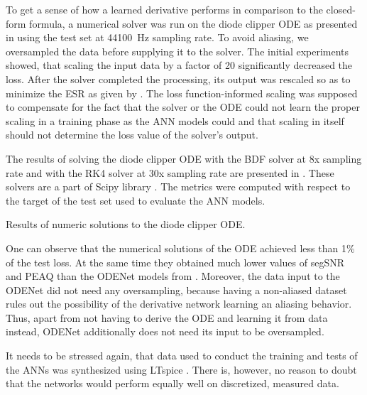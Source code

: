 To get a sense of how a learned derivative performs in comparison to the closed-form formula, a numerical solver was run on the diode clipper \ac{ODE} as presented in  using the test set at \SI{44100}{Hz} sampling rate. To avoid aliasing, we oversampled the data before supplying it to the solver. The initial experiments showed, that scaling the input data by a factor of 20 significantly decreased the loss. After the solver completed the processing, its output was rescaled so as to minimize the \ac{ESR} as given by . The loss function-informed scaling was supposed to compensate for the fact that the solver or the \ac{ODE} could not learn the proper scaling in a training phase as the \ac{ANN} models could and that scaling in itself should not determine the loss value of the solver's output. 

The results of solving the diode clipper \ac{ODE} with the \ac{BDF} solver at 8x sampling rate and with the \ac{RK}4 solver at 30x sampling rate are presented in . These solvers are a part of Scipy library \cite{SciPy}. The metrics were computed with respect to the target of the test set used to evaluate the \ac{ANN} models.

\begin{table}[]
    \centering
    \caption{Results of numeric solutions to the diode clipper \ac{ODE}.}
    
    \label{tab:diode_clipper_ode_solvers}
\end{table}

One can observe that the numerical solutions of the \ac{ODE} achieved less than 1\% of the test loss. At the same time they obtained much lower values of \ac{segSNR} and \ac{PEAQ} than the ODENet models from . Moreover, the data input to the ODENet did not need any oversampling, because having a non-aliased dataset rules out the possibility of the derivative network learning an aliasing behavior. Thus, apart from not having to derive the \ac{ODE} and learning it from data instead, ODENet additionally does not need its input to be oversampled.

It needs to be stressed again, that data used to conduct the training and tests of the \acp{ANN} was synthesized using LTspice \cite{LTspice}. There is, however, no reason to doubt that the networks would perform equally well on discretized, measured data.

\newcommand{\subfigureWidth}{0.4\textwidth}
\newcommand{\subfigureScale}{0.8}

